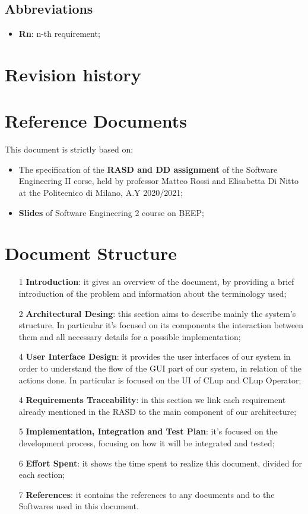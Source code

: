 \subsection{Abbreviations}
\begin{itemize}
\item \textbf{Rn}: n-th requirement;
\end{itemize}


\section{Revision history}
\section{Reference Documents}
This document is strictly based on:
\begin{itemize}
\item The specification of the \textbf{RASD and DD assignment} of the Software Engineering II corse, held by professor Matteo Rossi and Elisabetta Di Nitto at the Politecnico di Milano, A.Y 2020/2021;
\item \textbf{Slides} of Software Engineering 2 course on BEEP;
\end{itemize}
\section{Document Structure}
\begin{itemize}
\item[1]\textbf{Introduction}: it gives an overview of the document, by providing a brief introduction of the problem and information about the terminology used;
\item[2]\textbf{Architectural Desing}: this section aims to describe mainly the system’s structure. In particular it's focused on its components the interaction between them and all necessary details for a possible implementation; 
\item[4]\textbf{User Interface Design}: it provides the user interfaces of our system in order to understand the flow of the GUI part of our system, in relation of the actions done. In particular is focused on the UI of CLup and CLup Operator; 
\item[4]\textbf{Requirements Traceability}: in this section we link each requirement already mentioned in the RASD to the main component of our architecture;
\item[5]\textbf{Implementation, Integration and Test Plan}: it's focused on the development process, focusing on how it will be integrated and tested;
\item[6]\textbf{Effort Spent}: it shows the time spent to realize this document, divided for each section;
\item[7]\textbf{References}: it contains the references to any documents and to the Softwares used in this document.
\end{itemize}


